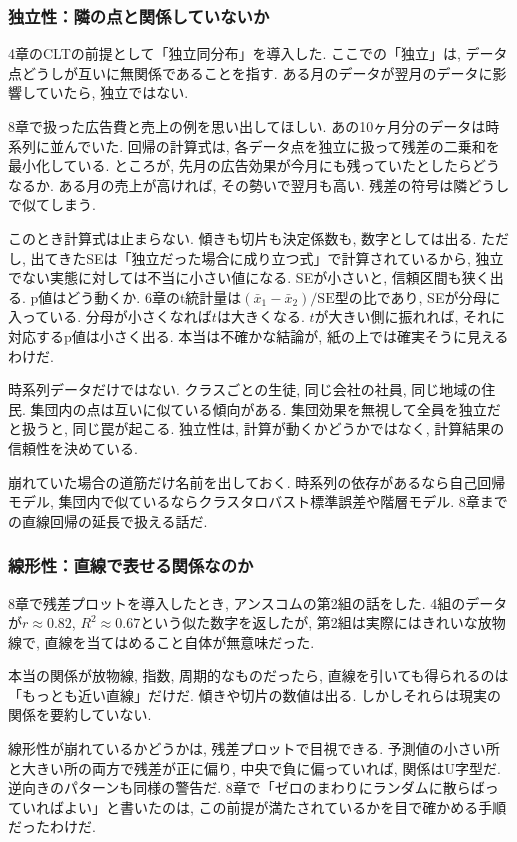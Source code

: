 \subsubsection*{独立性：隣の点と関係していないか}

4章のCLTの前提として「独立同分布」を導入した.
ここでの「独立」は, データ点どうしが互いに無関係であることを指す.
ある月のデータが翌月のデータに影響していたら, 独立ではない.

8章で扱った広告費と売上の例を思い出してほしい.
あの10ヶ月分のデータは時系列に並んでいた.
回帰の計算式は, 各データ点を独立に扱って残差の二乗和を最小化している.
ところが, 先月の広告効果が今月にも残っていたとしたらどうなるか.
ある月の売上が高ければ, その勢いで翌月も高い. 残差の符号は隣どうしで似てしまう.

このとき計算式は止まらない. 傾きも切片も決定係数も, 数字としては出る.
ただし, 出てきたSEは「独立だった場合に成り立つ式」で計算されているから, 独立でない実態に対しては不当に小さい値になる.
SEが小さいと, 信頼区間も狭く出る.
p値はどう動くか. 6章のt統計量は$(\bar{x}_1-\bar{x}_2)/\mathrm{SE}$型の比であり, SEが分母に入っている.
分母が小さくなれば$t$は大きくなる. $t$が大きい側に振れれば, それに対応するp値は小さく出る.
本当は不確かな結論が, 紙の上では確実そうに見えるわけだ.

時系列データだけではない. クラスごとの生徒, 同じ会社の社員, 同じ地域の住民. 集団内の点は互いに似ている傾向がある.
集団効果を無視して全員を独立だと扱うと, 同じ罠が起こる.
独立性は, 計算が動くかどうかではなく, 計算結果の信頼性を決めている.

崩れていた場合の道筋だけ名前を出しておく. 時系列の依存があるなら自己回帰モデル, 集団内で似ているならクラスタロバスト標準誤差や階層モデル. 8章までの直線回帰の延長で扱える話だ.

\subsubsection*{線形性：直線で表せる関係なのか}

8章で残差プロットを導入したとき, アンスコムの第2組の話をした.
4組のデータが$r \approx 0.82$, $R^2 \approx 0.67$という似た数字を返したが, 第2組は実際にはきれいな放物線で, 直線を当てはめること自体が無意味だった.

本当の関係が放物線, 指数, 周期的なものだったら, 直線を引いても得られるのは「もっとも近い直線」だけだ.
傾きや切片の数値は出る. しかしそれらは現実の関係を要約していない.

線形性が崩れているかどうかは, 残差プロットで目視できる.
予測値の小さい所と大きい所の両方で残差が正に偏り, 中央で負に偏っていれば, 関係はU字型だ.
逆向きのパターンも同様の警告だ.
8章で「ゼロのまわりにランダムに散らばっていればよい」と書いたのは, この前提が満たされているかを目で確かめる手順だったわけだ.

